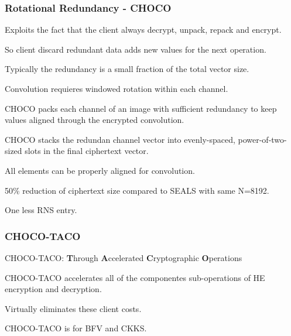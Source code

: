 \documentclass[10pt,handout]{beamer}
\begin{document}


\begin{frame}
\frametitle{Rotational Redundancy - CHOCO}
Exploits the fact that the client  always decrypt, unpack, repack and encrypt.

So client discard redundant data adds new values for the next operation.

Typically the redundancy is a small fraction of the total vector size.

Convolution requieres windowed rotation within each channel.

CHOCO packs each channel of an image with sufficient redundancy to keep
values aligned through the encrypted convolution.

CHOCO stacks the redundan channel vector into evenly-spaced, power-of-two-sized slots in the final ciphertext vector.

All elements can be properly aligned for convolution.

50\% reduction of ciphertext size compared to SEALS with same N=8192.

One less  RNS entry.
\end{frame}


\begin{frame}
\frametitle{CHOCO-TACO}
CHOCO-TACO: \textbf{T}hrough \textbf{A}ccelerated \textbf{C}ryptographic \textbf{O}perations

CHOCO-TACO accelerates all of the componentes sub-operations of HE encryption and decryption.

Virtually eliminates these client costs.

CHOCO-TACO is for BFV and CKKS.




\end{frame}
\end{document}
